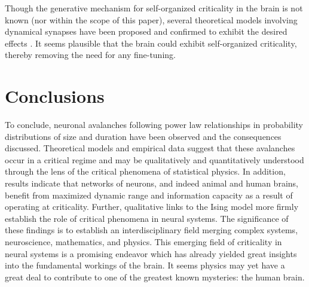 \documentclass[12pt]{article}
\begin{document}
Though the generative mechanism for self-organized criticality in the brain is not known (nor within the scope of this paper), several theoretical models involving dynamical synapses have been proposed and confirmed to exhibit the desired effects \cite{Levina2007a, Levina2009a, Bornholdt2003a, Rybarsch2014a}. It seems plausible that the brain could exhibit self-organized criticality, thereby removing the need for any fine-tuning.

\section*{Conclusions}

To conclude, neuronal avalanches following power law relationships in probability distributions of size and duration have been observed and the consequences discussed. Theoretical models and empirical data suggest that these avalanches occur in a critical regime and may be qualitatively and quantitatively understood through the lens of the critical phenomena of statistical physics. In addition, results indicate that networks of neurons, and indeed animal and human brains, benefit from maximized dynamic range and information capacity as a result of operating at criticality. Further, qualitative links to the Ising model more firmly establish the role of critical phenomena in neural systems. The significance of these findings is to establish an interdisciplinary field merging complex systems, neuroscience, mathematics, and physics. This emerging field of criticality in neural systems is a promising endeavor which has already yielded great insights into the fundamental workings of the brain. It seems physics may yet have a great deal to contribute to one of the greatest known mysteries: the human brain. 



{\small
}
\end{document}
